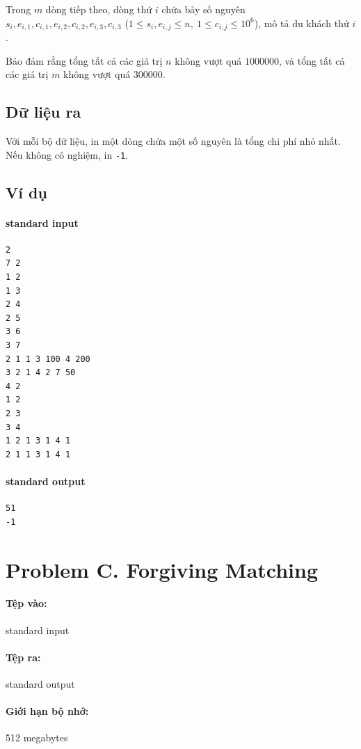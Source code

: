 \documentclass[11pt]{article}
\begin{document}
Trong \(m\) dòng tiếp theo, dòng thứ \(i\) chứa bảy số nguyên
\(s_i,e_{i,1},c_{i,1},e_{i,2},c_{i,2},e_{i,3},c_{i,3}\)
(\(1\le s_i,e_{i,j}\le n,\ 1\le c_{i,j}\le 10^6\)), mô tả du khách thứ \(i\).

Bảo đảm rằng tổng tất cả các giá trị \(n\) không vượt quá \(1000000\), và
tổng tất cả các giá trị \(m\) không vượt quá \(300000\).

\subsection*{Dữ liệu ra}

Với mỗi bộ dữ liệu, in một dòng chứa một số nguyên là tổng chi phí nhỏ nhất.
Nếu không có nghiệm, in \texttt{-1}.

\subsection*{Ví dụ}

\paragraph{standard input}
\begin{verbatim}
2
7 2
1 2
1 3
2 4
2 5
3 6
3 7
2 1 1 3 100 4 200
3 2 1 4 2 7 50
4 2
1 2
2 3
3 4
1 2 1 3 1 4 1
2 1 1 3 1 4 1
\end{verbatim}

\paragraph{standard output}
\begin{verbatim}
51
-1
\end{verbatim}

\section{Problem C. Forgiving Matching}

\paragraph{Tệp vào:} standard input
\paragraph{Tệp ra:} standard output
\paragraph{Giới hạn bộ nhớ:} 512 megabytes
\end{document}
